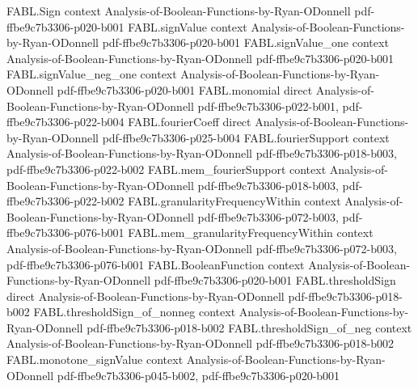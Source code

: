 \begin{theorem}
\label{FABL.IsEqualWeightThreshold.symmetric_and_monotone}
\leanok
{}
\proofstep
  {FABL.Sign}
  {context}
  {Analysis-of-Boolean-Functions-by-Ryan-ODonnell}
  {pdf-ffbe9c7b3306-p020-b001}
\proofstep
  {FABL.signValue}
  {context}
  {Analysis-of-Boolean-Functions-by-Ryan-ODonnell}
  {pdf-ffbe9c7b3306-p020-b001}
\proofstep
  {FABL.signValue_one}
  {context}
  {Analysis-of-Boolean-Functions-by-Ryan-ODonnell}
  {pdf-ffbe9c7b3306-p020-b001}
\proofstep
  {FABL.signValue_neg_one}
  {context}
  {Analysis-of-Boolean-Functions-by-Ryan-ODonnell}
  {pdf-ffbe9c7b3306-p020-b001}
\proofstep
  {FABL.monomial}
  {direct}
  {Analysis-of-Boolean-Functions-by-Ryan-ODonnell}
  {pdf-ffbe9c7b3306-p022-b001,
    pdf-ffbe9c7b3306-p022-b004}
\proofstep
  {FABL.fourierCoeff}
  {direct}
  {Analysis-of-Boolean-Functions-by-Ryan-ODonnell}
  {pdf-ffbe9c7b3306-p025-b004}
\proofstep
  {FABL.fourierSupport}
  {context}
  {Analysis-of-Boolean-Functions-by-Ryan-ODonnell}
  {pdf-ffbe9c7b3306-p018-b003,
    pdf-ffbe9c7b3306-p022-b002}
\proofstep
  {FABL.mem_fourierSupport}
  {context}
  {Analysis-of-Boolean-Functions-by-Ryan-ODonnell}
  {pdf-ffbe9c7b3306-p018-b003,
    pdf-ffbe9c7b3306-p022-b002}
\proofstep
  {FABL.granularityFrequencyWithin}
  {context}
  {Analysis-of-Boolean-Functions-by-Ryan-ODonnell}
  {pdf-ffbe9c7b3306-p072-b003,
    pdf-ffbe9c7b3306-p076-b001}
\proofstep
  {FABL.mem_granularityFrequencyWithin}
  {context}
  {Analysis-of-Boolean-Functions-by-Ryan-ODonnell}
  {pdf-ffbe9c7b3306-p072-b003,
    pdf-ffbe9c7b3306-p076-b001}
\proofstep
  {FABL.BooleanFunction}
  {context}
  {Analysis-of-Boolean-Functions-by-Ryan-ODonnell}
  {pdf-ffbe9c7b3306-p020-b001}
\proofstep
  {FABL.thresholdSign}
  {direct}
  {Analysis-of-Boolean-Functions-by-Ryan-ODonnell}
  {pdf-ffbe9c7b3306-p018-b002}
\proofstep
  {FABL.thresholdSign_of_nonneg}
  {context}
  {Analysis-of-Boolean-Functions-by-Ryan-ODonnell}
  {pdf-ffbe9c7b3306-p018-b002}
\proofstep
  {FABL.thresholdSign_of_neg}
  {context}
  {Analysis-of-Boolean-Functions-by-Ryan-ODonnell}
  {pdf-ffbe9c7b3306-p018-b002}
\proofstep
  {FABL.monotone_signValue}
  {context}
  {Analysis-of-Boolean-Functions-by-Ryan-ODonnell}
  {pdf-ffbe9c7b3306-p045-b002,
    pdf-ffbe9c7b3306-p020-b001}

\end{theorem}

